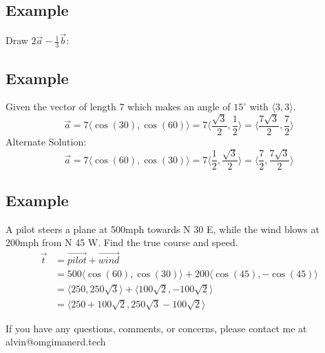 \documentclass[letterpaper, 12pt]{math}
\begin{document}
\subsection*{Example}
Draw \( 2\vec{a}-\frac{1}{3}\vec{b} \):
\begin{center}
\end{center}

\subsection*{Example}
Given the vector of length 7 which makes an angle of \( 15^{\circ} \) with
\( \langle3,3\rangle \).
\[ \vec{a} = 7\langle\cos(30),\cos(60)\rangle =
  7\langle\frac{\sqrt{3}}{2},\frac{1}{2}\rangle =
  \langle\frac{7\sqrt{3}}{2},\frac{7}{2}\rangle \]
Alternate Solution:
\[ \vec{a} = 7\langle\cos(60),\cos(30)\rangle =
  7\langle\frac{1}{2},\frac{\sqrt{3}}{2}\rangle =
  \langle\frac{7}{2},\frac{7\sqrt{3}}{2}\rangle \]

\subsection*{Example}
A pilot steers a plane at 500mph towards N 30 E, while the wind blows at 200mph
from N 45 W. Find the true course and speed.
\begin{align*}
  \vec{t} &= \vec{pilot}+\vec{wind} \\
  &= 500\langle\cos(60),\cos(30)\rangle+200\langle\cos(45),-\cos(45)\rangle \\
  &= \langle250,250\sqrt{3}\rangle+\langle100\sqrt{2},-100\sqrt{2}\rangle \\
  &= \langle250+100\sqrt{2},250\sqrt{3}-100\sqrt{2}\rangle
\end{align*}

\begin{center}
  If you have any questions, comments, or concerns, please contact me at
  alvin@omgimanerd.tech
\end{center}
\end{document}
